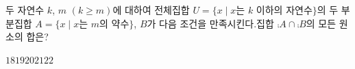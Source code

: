 두 자연수 $k$, $m$ $(k\ge m)$에 대하여 전체집합 $U=\{x \mid x$는 $k$ 이하의 자연수$\}$의 두 부분집합 $A=\{x \mid x$는 $m$의 약수$\}$, $B$가 다음 조건을 만족시킨다.집합 $\comp{A}\cap\comp{B}$의 모든 원소의 합은?
\begin{choices32}{$18$}{$19$}{$20$}{$21$}{$22$}\end{choices32}
